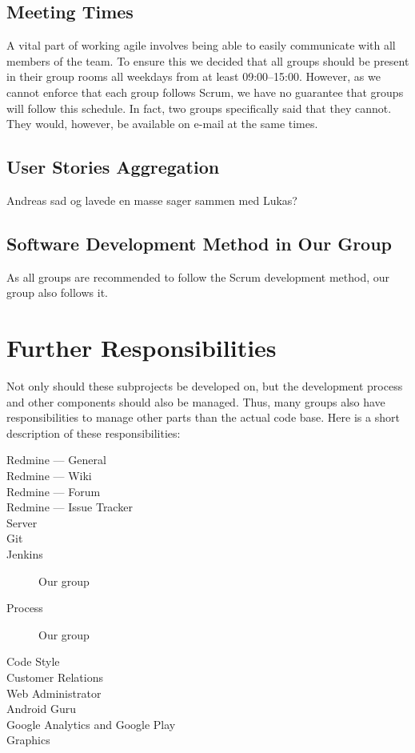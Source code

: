 \subsection{Meeting Times}
A vital part of working agile involves being able to easily communicate with all members of the team. To ensure this we decided that all groups should be present in their group rooms all weekdays from at least 09:00--15:00. However, as we cannot enforce that each group follows Scrum, we have no guarantee that groups will follow this schedule. In fact, two groups specifically said that they cannot. They would, however, be available on e-mail at the same times.

\subsection{User Stories Aggregation}
Andreas sad og lavede en masse sager sammen med Lukas?

\subsection{Software Development Method in Our Group}
As all groups are recommended to follow the Scrum development method, our group also follows it.

\section{Further Responsibilities}\label{sec:responsibilities}
Not only should these subprojects be developed on, but the development process and other components should also be managed. Thus, many groups also have responsibilities to manage other parts than the actual code base. Here is a short description of these responsibilities:

\begin{description}
  \item[Redmine --- General] \dummy \dummy
	\item[Redmine --- Wiki] \dummy \dummy
	\item[Redmine --- Forum] \dummy
	\item[Redmine --- Issue Tracker] \dummy \dummy
	\item[Server] \dummy \dummy
	\item[Git] \dummy \dummy
	\item[Jenkins] Our group
	\item[Process] Our group
	\item[Code Style] \dummy \dummy
	\item[Customer Relations] \dummy \dummy
	\item[Web Administrator] \dummy \dummy
	\item[Android Guru] \dummy \dummy
	\item[Google Analytics and Google Play] \dummy \dummy
	\item[Graphics] \dummy \dummy
\end{description}

